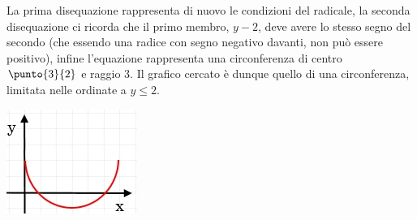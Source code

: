 \begin{esempio}
\noindent \begin{minipage}{.7\textwidth}
La prima disequazione rappresenta di nuovo le condizioni del 
radicale, la seconda disequazione ci ricorda che il primo membro, \(y-2\), deve 
avere lo stesso segno del secondo (che essendo una radice con segno 
negativo davanti, non può essere positivo), infine l'equazione rappresenta 
una circonferenza di centro \(\punto{3}{2}\) e raggio \(3\). Il grafico cercato è dunque quello di una 
circonferenza, limitata nelle ordinate a 
\(y\leq2\).
  \end{minipage}
  \hfill
  \begin{minipage}{.25\textwidth}
    \includegraphics[width=\textwidth]{img/curva2.jpg}
  \end{minipage}

\end{esempio}

